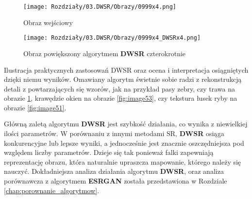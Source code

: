 \begin{figure}[ht]
    \centering
    \begin{minipage}[t]{0.45\linewidth}
        \texttt{[image: Rozdziały/03.DWSR/Obrazy/0999x4.png]}
        \caption{Obraz wejściowy \cite{guo2017deep}}
        \label{fig:image54}
    \end{minipage}
    \hspace{0.5cm}
    \begin{minipage}[t]{0.45\linewidth}
        \texttt{[image: Rozdziały/03.DWSR/Obrazy/0999x4\_DWSRx4.png]}
        \caption{Obraz powiększony algorytmem \textbf{DWSR} czterokrotnie}
        \label{fig:image55}
    \end{minipage}
\end{figure}

Ilustracja praktycznych zastosowań DWSR oraz ocena i interpretacja osiągniętych dzięki niemu wyników.
Omawiany algorytm świetnie sobie radzi z rekonstrukcją detali z powtarzających się wzorów, jak na przykład pasy zebry, czy trawa na obrazie \ref{fig:image55}, krawędzie okien na obrazie \ref{fig:image53}, czy tekstura łusek ryby na obrazie \ref{fig:image51}.


Główną zaletą algorytmu \textbf{DWSR} jest szybkość działania, co wynika z niewielkiej ilości parametrów. W porównaniu z innymi metodami SR, \textbf{DWSR} osiąga konkurencyjne lub lepsze wyniki, a jednocześnie jest znacznie oszczędniejsza pod względem liczby parametrów. Dzieje się tak ponieważ falki zapewniają reprezentację obrazu, która naturalnie upraszcza mapowanie, którego należy się nauczyć. 
Dokładniejsza analiza działania algorytmu \textbf{DWSR}, oraz analiza porównawcza z algorytmem \textbf{ESRGAN} została przedstawiona w Rozdziale \ref{chap:porownanie_algorytmow}.